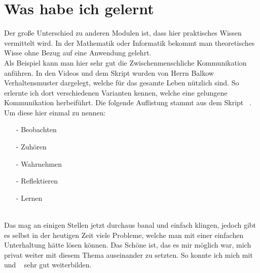 \chapter{Was habe ich gelernt}

Der große Unterschied zu anderen Modulen ist, dass hier praktisches Wissen vermittelt wird. In der Mathematik oder Informatik  bekommt man theoretisches Wisse ohne Bezug auf eine Anwendung gelehrt. \\


Als Beispiel kann man hier sehr gut die Zwischenmenschliche Kommunikation anführen. In den Videos und dem Skript wurden von Herrn Balkow Verhaltensmuster dargelegt, welche für das gesamte Leben nützlich sind. So erlernte ich dort verschiedenen Varianten kennen, welche eine  gelungene Kommunikation herbeiführt. Die folgende Auflistung stammt aus dem Skript ~\cite{Skript}. Um diese hier einmal zu nennen:
\begin{itemize}
	\item[-] Beobachten
	\item[-] Zuhören
	\item[-] Wahrnehmen
	\item[-] Reflektieren
	\item[-] Lernen
\end{itemize} \\

 
Das mag an einigen Stellen jetzt durchaus banal und einfach klingen, jedoch gibt es selbst in der heutigen Zeit viele Probleme, welche man mit einer einfachen Unterhaltung hätte lösen können. Das Schöne ist, das es mir möglich war, mich privat weiter mit diesem Thema auseinander zu setzten. So konnte ich mich mit ~\cite{Schlüssel} und ~\cite{fRede} sehr gut weiterbilden.